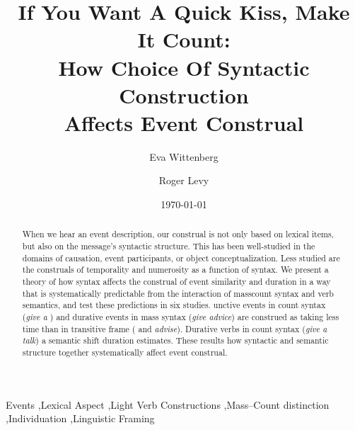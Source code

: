 \documentclass[review,12pt,authoryear]{elsarticle}
\date{\today}
\begin{document}
\begin{frontmatter}

\title{If You Want A Quick Kiss, Make It Count:\\
How Choice Of Syntactic Construction \\Affects Event Construal}

\author[ucsd]{Eva Wittenberg}
\author[ucsd,mit]{Roger Levy}

\address[ucsd]{Department of Linguistics\\University of California, San Diego\\9500 Gilman Drive\\La Jolla, CA 92093-0108}
\address[mit]{Department of Brain and Cognitive Sciences\\
Massachusetts Institute of Technology\\
77 Massachusetts Avenue\\
Cambridge, MA 02139-4307}



\begin{abstract}
When we hear an event description, our  construal is not only based on lexical items, but also on the message's syntactic structure. This has been well-studied in the domains of causation, event participants, or object conceptualization. Less studied are the construals of temporality and numerosity as a function of syntax. We present a theory of how  syntax  affects the construal of event similarity and duration in a way that is systematically predictable from the interaction of masscount syntax and verb semantics, and test these predictions in six studies. unctive events in count syntax{ (\emph{give a })} and durative events in mass syntax{ (\emph{give advice})} are construed as taking less time than in transitive frame{ (\emph{} and \emph{advise})}. Durative verbs in count syntax (\emph{give a talk}) a semantic shift duration estimates. These results how syntactic and semantic structure together systematically affect event construal.

\end{abstract}


\begin{keyword}
Events \sep Lexical Aspect \sep Light Verb Constructions \sep Mass--Count distinction \sep Individuation \sep Linguistic Framing
\end{keyword}

\end{frontmatter}
\end{document}
